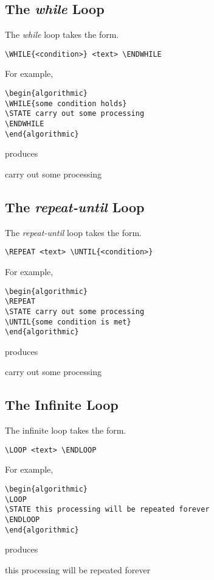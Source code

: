 \documentclass[letterpaper]{article}
\begin{document}
\subsection{The \emph{while} Loop}

The \emph{while} loop takes the form.
\begin{verbatim}
\WHILE{<condition>} <text> \ENDWHILE
\end{verbatim}
For example,
\begin{verbatim}
\begin{algorithmic}
\WHILE{some condition holds}
\STATE carry out some processing 
\ENDWHILE
\end{algorithmic}
\end{verbatim}
produces
\begin{algorithmic}
    \STATE carry out some processing 
  \ENDWHILE
\end{algorithmic}

\subsection{The \emph{repeat-until} Loop}

The \emph{repeat-until} loop takes the form.
\begin{verbatim}
\REPEAT <text> \UNTIL{<condition>}
\end{verbatim}
For example,
\begin{verbatim}
\begin{algorithmic}
\REPEAT
\STATE carry out some processing 
\UNTIL{some condition is met}
\end{algorithmic}
\end{verbatim}
produces
\begin{algorithmic}
  \REPEAT
    \STATE carry out some processing 
\end{algorithmic}

\subsection{The Infinite Loop}

The infinite loop takes the form.
\begin{verbatim}
\LOOP <text> \ENDLOOP
\end{verbatim}
For example,
\begin{verbatim}
\begin{algorithmic}
\LOOP
\STATE this processing will be repeated forever
\ENDLOOP
\end{algorithmic}
\end{verbatim}
produces
\begin{algorithmic}
  \LOOP
    \STATE this processing will be repeated forever
  \ENDLOOP
\end{algorithmic}
\end{document}
